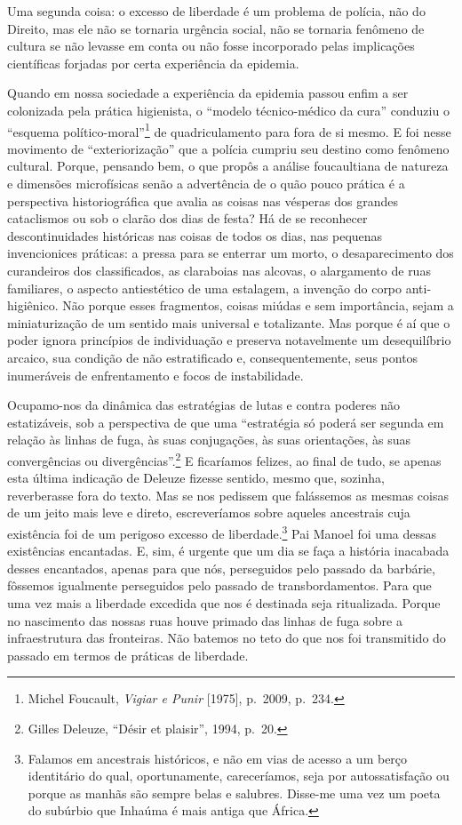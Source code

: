 Uma segunda coisa: o excesso de liberdade é um problema de polícia, não
do Direito, mas ele não se tornaria urgência social, não se tornaria
fenômeno de cultura se não levasse em conta ou não fosse incorporado
pelas implicações científicas forjadas por certa experiência da
epidemia.

Quando em nossa sociedade a experiência da epidemia passou enfim a ser
colonizada pela prática higienista, o ``modelo técnico-médico da cura''
conduziu o ``esquema político-moral''\footnote{Michel Foucault,
  \emph{Vigiar e Punir} {[}1975{]}, p.~2009, p.~234.} de quadriculamento
para fora de si mesmo. E foi nesse movimento de ``exteriorização'' que a
polícia cumpriu seu destino como fenômeno cultural. Porque, pensando
bem, o que propôs a análise foucaultiana de natureza e dimensões
microfísicas senão a advertência de o quão pouco prática é a perspectiva
historiográfica que avalia as coisas nas vésperas dos grandes
cataclismos ou sob o clarão dos dias de festa? Há de se reconhecer
descontinuidades históricas nas coisas de todos os dias, nas pequenas
invencionices práticas: a pressa para se enterrar um morto, o
desaparecimento dos curandeiros dos classificados, as claraboias nas
alcovas, o alargamento de ruas familiares, o aspecto antiestético de uma
estalagem, a invenção do corpo anti-higiênico. Não porque esses
fragmentos, coisas miúdas e sem importância, sejam a miniaturização de
um sentido mais universal e totalizante. Mas porque é aí que o poder
ignora princípios de individuação e preserva notavelmente um
desequilíbrio arcaico, sua condição de não estratificado e,
consequentemente, seus pontos inumeráveis de enfrentamento e focos de
instabilidade.

Ocupamo-nos da dinâmica das estratégias de lutas e contra poderes não
estatizáveis, sob a perspectiva de que uma ``estratégia só poderá ser
segunda em relação às linhas de fuga, às suas conjugações, às suas
orientações, às suas convergências ou divergências''.\footnote{Gilles
  Deleuze, ``Désir et plaisir'', 1994, p.~20.} E ficaríamos felizes, ao
final de tudo, se apenas esta última indicação de Deleuze fizesse
sentido, mesmo que, sozinha, reverberasse fora do texto. Mas se nos
pedissem que falássemos as mesmas coisas de um jeito mais leve e direto,
escreveríamos sobre aqueles ancestrais cuja existência foi de um
perigoso excesso de liberdade.\footnote{Falamos em ancestrais
  históricos, e não em vias de acesso a um berço identitário do qual,
  oportunamente, careceríamos, seja por autossatisfação ou porque as
  manhãs são sempre belas e salubres. Disse-me uma vez um poeta do
  subúrbio que Inhaúma é mais antiga que África.} Pai Manoel foi uma
dessas existências encantadas. E, sim, é urgente que um dia se faça a
história inacabada desses encantados, apenas para que nós, perseguidos
pelo passado da barbárie, fôssemos igualmente perseguidos pelo passado
de transbordamentos. Para que uma vez mais a liberdade excedida que nos
é destinada seja ritualizada. Porque no nascimento das nossas ruas houve
primado das linhas de fuga sobre a infraestrutura das fronteiras. Não
batemos no teto do que nos foi transmitido do passado em termos de
práticas de liberdade.

